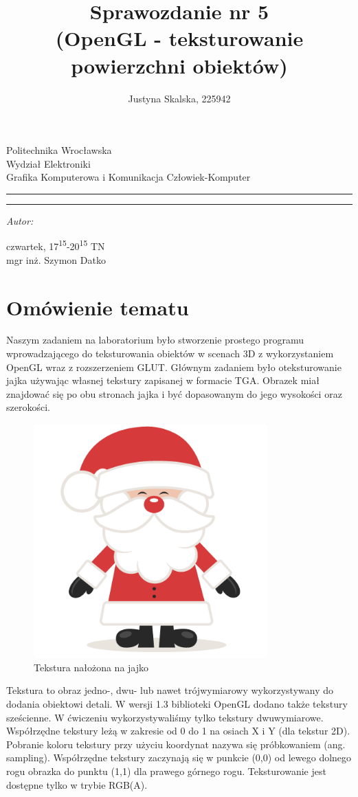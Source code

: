 \documentclass[12pt,a4paper,titlepage]{article}
\author{Justyna Skalska, 225942}
\title{Sprawozdanie nr 5\\
(OpenGL - teksturowanie powierzchni obiektów)}
\makeatletter
\newcommand{\linia}{\rule{\linewidth}{0.4mm}}
\renewcommand{\maketitle}{\begin{titlepage}
    \vspace*{1cm}
    \begin{center}\small
    Politechnika Wrocławska\\
    Wydział Elektroniki\\
    Grafika Komputerowa i Komunikacja Człowiek-Komputer
    \end{center}
    \vspace{3cm}
    \noindent\linia
    \begin{center}
      \LARGE \textsc{\@title}
         \end{center}
     \linia
    \vspace{0.5cm}
    \begin{flushright}
    \begin{minipage}{7cm}
    \textit{\small Autor:}\\
    \normalsize \textsc{\@author} \par
    \end{minipage}
    \vspace{5cm}

     {\small czwartek, 17\textsuperscript{15}-20\textsuperscript{15} TN}\\
        mgr inż. Szymon Datko
     \end{flushright}
    \vspace*{\stretch{6}}
    \begin{center}
    \@date
    \end{center}
  \end{titlepage}%
}
\makeatother
\begin{document}
\maketitle
\section{Omówienie tematu}
Naszym zadaniem na laboratorium było stworzenie prostego programu wprowadzającego do teksturowania obiektów w scenach 3D z wykorzystaniem OpenGL wraz z rozszerzeniem GLUT. Głównym zadaniem było oteksturowanie jajka używając własnej tekstury zapisanej w formacie TGA. Obrazek miał znajdować się po obu stronach jajka i być dopasowanym do jego wysokości oraz szerokości.

\begin{figure}[H]
\centering
\includegraphics[width = 9cm]{images/tekstura.png}
\caption{Tekstura nałożona na jajko}
\label{fig:tekstura}
\end{figure}

Tekstura to obraz jedno-, dwu- lub nawet trójwymiarowy wykorzystywany do dodania obiektowi detali. W wersji 1.3 biblioteki OpenGL dodano także tekstury sześcienne. W ćwiczeniu wykorzystywaliśmy tylko tekstury dwuwymiarowe. Współrzędne tekstury leżą w zakresie od 0 do 1 na osiach X i Y (dla tekstur 2D). Pobranie koloru tekstury przy użyciu koordynat nazywa się próbkowaniem (ang. sampling). Współrzędne tekstury zaczynają się w punkcie (0,0) od lewego dolnego rogu obrazka do punktu (1,1) dla prawego górnego rogu. Teksturowanie jest dostępne tylko w trybie RGB(A).
\end{document}
